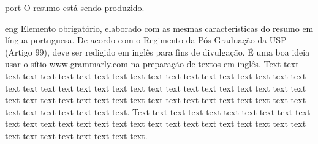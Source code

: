 
\begin{resumo}{port}
    O resumo está sendo produzido.
\end{resumo}
    
    \begin{resumo}{eng}
    Elemento obrigatório, elaborado com as mesmas características do resumo em
    língua portuguesa. De acordo com o Regimento da Pós-Graduação da USP (Artigo
    99), deve ser redigido em inglês para fins de divulgação. É uma boa ideia usar
    o sítio \url{www.grammarly.com} na preparação de textos em inglês.
    Text text text text text text text text text text text text text text text text
    text text text text text text text text text text text text text text text text
    text text text text text text text text text text text text text text text text
    text text text text text text text text text text text text.
    Text text text text text text text text text text text text text text text text
    text text text text text text text text text text text text text text text text
    text text text.
    \end{resumo}
    
    